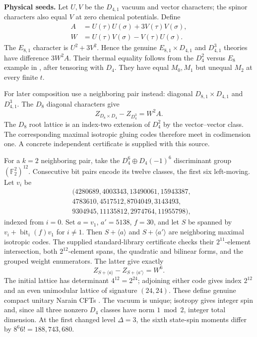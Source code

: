 \documentclass[aps,prl,reprint,10pt,longbibliography]{revtex4-2}
\newcommand{\F}{\mathbb F}
\begin{document}
\noindent\textbf{Physical seeds.}
Let $U,V$ be the $D_{4,1}$ vacuum and vector characters; the spinor
characters also equal $V$ at zero chemical potentials. Define
\begin{equation}
\begin{aligned}
 A&=U(\tau)U(\sigma)+3V(\tau)V(\sigma),\\
 W&=U(\tau)V(\sigma)-V(\tau)U(\sigma).
\end{aligned}
 \label{eq:AW}
\end{equation}
The $E_{8,1}$ character is $U^2+3V^2$. Hence the genuine
$E_{8,1}\times D_{4,1}$ and $D_{4,1}^3$ theories have difference
$3W^2A$. Their thermal equality follows from the $D_4^2$ versus $E_8$
example in \cite{ashrafi}, after tensoring with $D_4$. They have equal
$M_0,M_1$ but unequal $M_2$ at every
finite $t$.

For later composition use a neighboring pair instead: diagonal
$D_{8,1}\times D_{4,1}$ and $D_{4,1}^3$. The $D_8$ diagonal
characters give
\begin{equation}
 Z_{D_8\times D_4}-Z_{D_4^3}=W^2A.
 \label{eq:k1}
\end{equation}
The $D_8$ root lattice is an index-two extension of $D_4^2$ by the
vector--vector class. The corresponding maximal isotropic gluing codes
therefore meet in codimension one. A concrete independent certificate
is supplied with this source.

For a $k=2$ neighboring pair, take the $D_4^6\oplus D_4(-1)^6$
discriminant group $(\F_2^2)^{12}$. Consecutive bit pairs encode its
twelve classes, the first six left-moving. Let $v_i$ be
\begin{align*}
 &(4280689,4003343,13490061,15943387,\\
 &4783610,4517512,8704049,3143493,\\
 &9304945,11135812,2974764,11955798),
\end{align*}
indexed from $i=0$. Set $a=v_1$, $a'=5138$, $f=30$, and let $S$ be
spanned by $v_i+\operatorname{bit}_i(f)v_1$ for $i\ne1$. Then
$S+\langle a\rangle$ and $S+\langle a'\rangle$ are neighboring
maximal isotropic codes. The supplied standard-library certificate
checks their $2^{11}$-element intersection, both $2^{12}$-element
spans, the quadratic and bilinear forms, and the grouped weight
enumerators. The latter give exactly
\begin{equation}
 Z_{S+\langle a\rangle}-Z_{S+\langle a'\rangle}=W^6.
 \label{eq:k2}
\end{equation}
The initial lattice has determinant $4^{12}=2^{24}$; adjoining
either code gives index $2^{12}$ and an even unimodular lattice of
signature $(24,24)$. These define genuine compact unitary Narain
CFTs \cite{narain,codes}. The vacuum is unique; isotropy gives
integer spin and, since all three nonzero $D_4$ classes have norm
$1\bmod2$, integer total dimension. At the first changed level
$\Delta=3$, the sixth state-spin moments differ by
$8^6 6!=188{,}743{,}680$.
\end{document}
